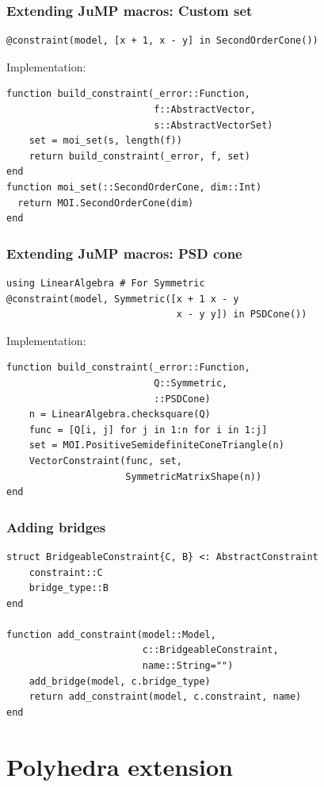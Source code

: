 \documentclass{beamer}
\begin{document}
\begin{frame}[fragile]
  \frametitle{Extending JuMP macros: Custom set}
\begin{verbatim}
@constraint(model, [x + 1, x - y] in SecondOrderCone())
\end{verbatim}
  Implementation:
\begin{verbatim}
function build_constraint(_error::Function,
                          f::AbstractVector,
                          s::AbstractVectorSet)
    set = moi_set(s, length(f))
    return build_constraint(_error, f, set)
end
function moi_set(::SecondOrderCone, dim::Int)
  return MOI.SecondOrderCone(dim)
end
\end{verbatim}
\end{frame}

\begin{frame}[fragile]
  \frametitle{Extending JuMP macros: PSD cone}
\begin{verbatim}
using LinearAlgebra # For Symmetric
@constraint(model, Symmetric([x + 1 x - y
                              x - y y]) in PSDCone())
\end{verbatim}
  Implementation:
\begin{verbatim}
function build_constraint(_error::Function,
                          Q::Symmetric,
                          ::PSDCone)
    n = LinearAlgebra.checksquare(Q)
    func = [Q[i, j] for j in 1:n for i in 1:j]
    set = MOI.PositiveSemidefiniteConeTriangle(n)
    VectorConstraint(func, set,
                     SymmetricMatrixShape(n))
end
\end{verbatim}
\end{frame}

\begin{frame}[fragile]
  \frametitle{Adding bridges}
\begin{verbatim}
struct BridgeableConstraint{C, B} <: AbstractConstraint
    constraint::C
    bridge_type::B
end

function add_constraint(model::Model,
                        c::BridgeableConstraint,
                        name::String="")
    add_bridge(model, c.bridge_type)
    return add_constraint(model, c.constraint, name)
end
\end{verbatim}
\end{frame}

\section{Polyhedra extension}
\end{document}
